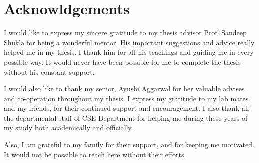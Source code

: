 \chapter*{Acknowldgements}


I would like to express my sincere gratitude to my thesis advisor Prof. Sandeep Shukla for being a wonderful mentor. His important suggestions and advice really helped me in my thesis. I thank him for all his teachings and guiding me in every possible way. It would never have been possible for me to complete the thesis without his constant support.

 I would also like to thank my senior, Ayushi Aggarwal for her valuable advises and co-operation throughout my thesis. I express my gratitude to my lab mates and my friends, for their continued support and encouragement. I also thank all the departmental staff of CSE Department for helping me during these years of my study both academically and officially.
 
 Also, I am grateful to my family for their support, and for keeping me motivated. It would not be possible to reach here without their efforts.
 
\vspace*{0.4in}

\noindent \hfill \textbf{\authorname}